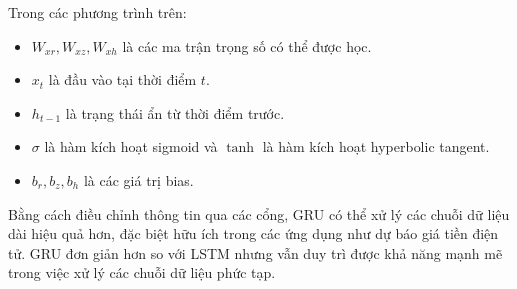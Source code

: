 \documentclass[conference]{IEEEtran}
\begin{document}
	Trong các phương trình trên:
	\begin{itemize}
		\item $W_{xr}, W_{xz}, W_{xh}$ là các ma trận trọng số có thể được học.
		\item $x_t$ là đầu vào tại thời điểm $t$.
		\item $h_{t-1}$ là trạng thái ẩn từ thời điểm trước.
		\item $\sigma$ là hàm kích hoạt sigmoid và $\tanh$ là hàm kích hoạt hyperbolic tangent.
		\item $b_r, b_z, b_h$ là các giá trị bias.
	\end{itemize}
	Bằng cách điều chỉnh thông tin qua các cổng, GRU có thể xử lý các chuỗi dữ liệu dài hiệu quả hơn, đặc biệt hữu ích trong các ứng dụng như dự báo giá tiền điện tử. GRU đơn giản hơn so với LSTM nhưng vẫn duy trì được khả năng mạnh mẽ trong việc xử lý các chuỗi dữ liệu phức tạp.
	
\end{document}
